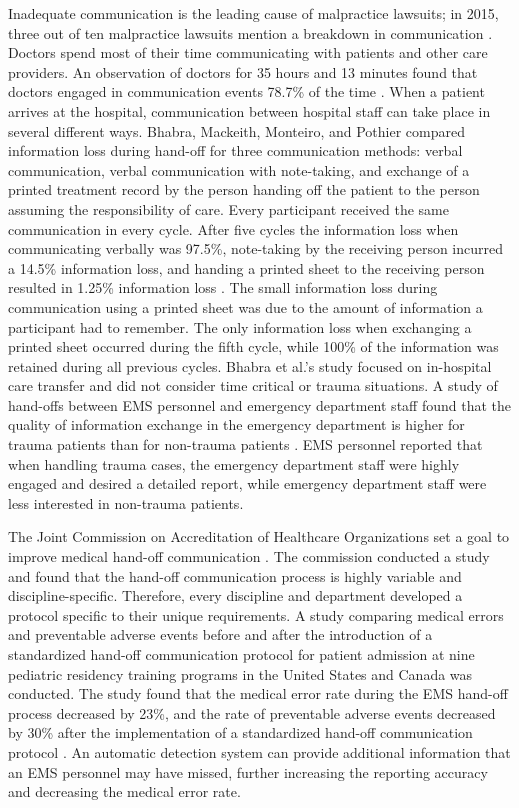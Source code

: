 \par Inadequate communication is the leading cause of malpractice lawsuits; in 2015, three out of ten malpractice lawsuits mention a breakdown in communication \cite{CRICOStrategies.2015}. Doctors spend most of their time communicating with patients and other care providers. An observation of doctors for 35 hours and 13 minutes found that doctors engaged in communication events 78.7\% of the time \cite{Spencer2004}. When a patient arrives at the hospital, communication between hospital staff can take place in several different ways. Bhabra, Mackeith, Monteiro, and Pothier \cite{Bhabra2007} compared information loss during hand-off for three communication methods: verbal communication, verbal communication with note-taking, and exchange of a printed treatment record by the person handing off the patient to the person assuming the responsibility of care. Every participant received the same communication in every cycle. After five cycles the information loss when communicating verbally was 97.5\%, note-taking by the receiving person incurred a 14.5\% information loss, and handing a printed sheet to the receiving person resulted in 1.25\% information loss \cite{Bhabra2007}. The small information loss during communication using a printed sheet was due to the amount of information a participant had to remember. The only information loss when exchanging a printed sheet occurred during the fifth cycle, while 100\% of the information was retained during all previous cycles. Bhabra et al.’s study focused on in-hospital care transfer and did not consider time critical or trauma situations. A study of hand-offs between EMS personnel and emergency department staff found that the quality of information exchange in the emergency department is higher for trauma patients than for non-trauma patients \cite{Meisel2015}. EMS personnel reported that when handling trauma cases, the emergency department staff were highly engaged and desired a detailed report, while emergency department staff were less interested in non-trauma patients.
\par The Joint Commission on Accreditation of Healthcare Organizations set a goal to improve medical hand-off communication \cite{Arora2006}. The commission conducted a study and found that the hand-off communication process is highly variable and discipline-specific. Therefore, every discipline and department developed a protocol specific to their unique requirements. A study comparing medical errors and preventable adverse events before and after the introduction of a standardized hand-off communication protocol for patient admission at nine pediatric residency training programs in the United States and Canada was conducted. The study found that the medical error rate during the EMS hand-off process decreased by 23\%, and the rate of preventable adverse events decreased by 30\% after the implementation of a standardized hand-off communication protocol \cite{Starmer2014}. An automatic detection system can provide additional information that an \gls{EMS} personnel may have missed, further increasing the reporting accuracy and decreasing the medical error rate.
